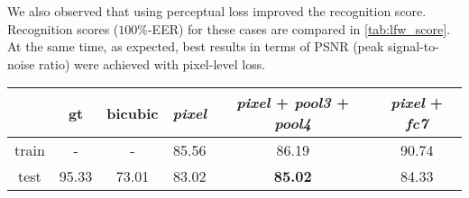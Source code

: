 We also observed that using perceptual loss improved the recognition score. Recognition scores ($100\%$-EER) for these cases are compared in  \ref{tab:lfw_score}. At the same time, as expected, best results in terms of PSNR (peak signal-to-noise ratio) were achieved with pixel-level loss. %





\begin{table*}
\centering
\begin{tabular}{ c | c c c c c }
  & gt & bicubic & \emph{pixel}  & \emph{pixel} + \emph{pool3} + \emph{pool4} & \emph{pixel} + \emph{fc7}  \\
\hline
train & -      & -    & 85.56 & 86.19 & 90.74\\
test  & 95.33 & 73.01 & 83.02 & \bf{85.02} & 84.33\\


\end{tabular}
\caption{100\% - EER (Equal error rate) values for the standard split $1$ of the FLW dataset. The scores for bicubic upsamling and ground truth images are also included. \emph{pixel} - the results achieved using pixel-level loss only. Best results were achieved using pixel-level loss along with \emph{Perceptual} loss for layers \emph{pool3} and \emph{pool4} of the pre-trained VGG-face model.}
\label{tab:lfw_score}
\end{table*}








